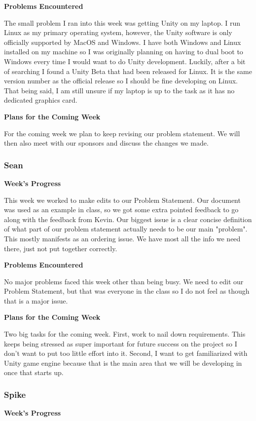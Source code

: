 \documentclass[10pt,journal,compsoc,onecolumn, draftclsnofoot]{IEEEtran}
\begin{document}
\noindent \textbf{Problems Encountered}

The small problem I ran into this week was getting Unity on my laptop. I run Linux as my primary operating system, however, the Unity software is only officially supported by MacOS and Windows. I have both Windows and Linux installed on my machine so I was originally planning on having to dual boot to Windows every time I would want to do Unity development. Luckily, after a bit of searching I found a Unity Beta that had been released for Linux. It is the same version number as the official release so I should be fine developing on Linux. That being said, I am still unsure if my laptop is up to the task as it has no dedicated graphics card.

\noindent \textbf{Plans for the Coming Week}

For the coming week we plan to keep revising our problem statement. We will then also meet with our sponsors and discuss the changes we made.

\subsubsection{Sean}
\noindent \textbf{Week's Progress}

This week we worked to make edits to our Problem Statement.  Our document was used as an example in class, so we got some extra pointed feedback to go along with the feedback from Kevin.  Our biggest issue is a clear concise definition of what part of our problem statement actually needs to be our main "problem".  This mostly manifests as an ordering issue.  We have most all the info we need there, just not put together correctly.

\noindent \textbf{Problems Encountered}

No major problems faced this week other than being busy.  We need to edit our Problem Statement, but that was everyone in the class so I do not feel as though that is a major issue.

\noindent \textbf{Plans for the Coming Week}

Two big tasks for the coming week.  First, work to nail down requirements.  This keeps being stressed as super important for future success on the project so I don't want to put too little effort into it.  Second, I want to get familiarized with Unity game engine because that is the main area that we will be developing in once that starts up.

\subsubsection{Spike}
\noindent \textbf{Week's Progress}
\end{document}
